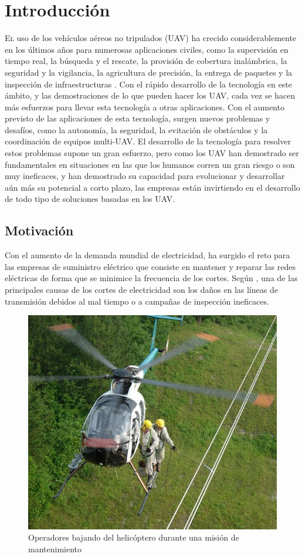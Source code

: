 \documentclass[fontsize=11pt, English=false, Español=true, Myfinal=true, twoside, numbers=noenddot]{scrbook}
\begin{document}
\chapter{Introducción}
\label{ch:Introduction}
\lettrine[lraise=-0.1, lines=2, loversize=0.2]{E}{l} uso de los vehículos aéreos no tripulados (\gls{UAV}) ha crecido considerablemente en los últimos años para numerosas aplicaciones civiles, como la supervisión en tiempo real, la búsqueda y el rescate, la provisión de cobertura inalámbrica, la seguridad y la vigilancia, la agricultura de precisión, la entrega de paquetes y la inspección de infraestructuras \cite{CivilAplications}. Con el rápido desarrollo de la tecnología en este ámbito, y las demostraciones de lo que pueden hacer los \gls{UAV}, cada vez se hacen más esfuerzos para llevar esta tecnología a otras aplicaciones. Con el aumento previsto de las aplicaciones de esta tecnología, surgen nuevos problemas y desafíos, como la autonomía, la seguridad, la evitación de obstáculos y la coordinación de equipos multi-\gls{UAV}. El desarrollo de la tecnología para resolver estos problemas supone un gran esfuerzo, pero como los \gls{UAV} han demostrado ser fundamentales en situaciones en las que los humanos corren un gran riesgo o son muy ineficaces, y han demostrado su capacidad para evolucionar y desarrollar aún más su potencial a corto plazo, las empresas están invirtiendo en el desarrollo de todo tipo de soluciones basadas en los \gls{UAV}.

\section{Motivación}
\label{sec:Motivation}
Con el aumento de la demanda mundial de electricidad, ha surgido el reto para las empresas de suministro eléctrico que consiste en mantener y reparar las redes eléctricas de forma que se minimice la frecuencia de los cortes. Según \cite{PowerOutagesCauses}, una de las principales causas de los cortes de electricidad son los daños en las líneas de transmisión debidos al mal tiempo o a campañas de inspección ineficaces.

\begin{figure}[htbp]
    \centering
    \includegraphics[width=0.6\linewidth]
    {Introduction/figures/helicopter.jpg}
    \caption{Operadores bajando del helicóptero durante una misión de mantenimiento}
    \label{fig:helicopter}
\end{figure}
\end{document}
